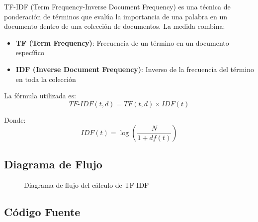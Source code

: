 \documentclass[12pt,a4paper]{article}
\begin{document}
TF-IDF (Term Frequency-Inverse Document Frequency) es una técnica de ponderación de términos que evalúa la importancia de una palabra en un documento dentro de una colección de documentos. La medida combina:

\begin{itemize}
    \item \textbf{TF (Term Frequency)}: Frecuencia de un término en un documento específico
    \item \textbf{IDF (Inverse Document Frequency)}: Inverso de la frecuencia del término en toda la colección
\end{itemize}

La fórmula utilizada es:
\begin{equation}
TF\text{-}IDF(t,d) = TF(t,d) \times IDF(t)
\end{equation}

Donde:
\begin{equation}
IDF(t) = \log\left(\frac{N}{1 + df(t)}\right)
\end{equation}

\subsection{Diagrama de Flujo}

\begin{figure}[H]
    \centering
    
    \caption{Diagrama de flujo del cálculo de TF-IDF}
    \label{fig:diagrama_tfidf}
\end{figure}

\subsection{Código Fuente}
\end{document}
